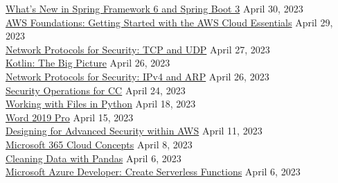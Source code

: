 \documentclass[10pt]{res} %
\begin{document}
\begin{resume}
\href{https://bjdelacruz.dev/files/certificates/pluralsight/Whats_New_in_Spring_Framework_6_and_Spring_Boot_3.pdf}{\color{blue}What's New in Spring Framework 6 and Spring Boot 3} \hfill April 30, 2023 \\
\href{https://bjdelacruz.dev/files/certificates/pluralsight/AWS_Foundations_Getting_Started_with_the_AWS_Cloud_Essentials.pdf}{\color{blue}AWS Foundations: Getting Started with the AWS Cloud Essentials} \hfill April 29, 2023 \\
\href{https://bjdelacruz.dev/files/certificates/pluralsight/4_Network_Protocols_for_Security_TCP_and_UDP.pdf}{\color{blue}Network Protocols for Security: TCP and UDP} \hfill April 27, 2023 \\
\href{https://bjdelacruz.dev/files/certificates/pluralsight/Kotlin_The_Big_Picture.pdf}{\color{blue}Kotlin: The Big Picture} \hfill April 26, 2023 \\
\href{https://bjdelacruz.dev/files/certificates/pluralsight/5_Network_Protocols_for_Security_IPv4_and_ARP.pdf}{\color{blue}Network Protocols for Security: IPv4 and ARP} \hfill April 26, 2023 \\
\href{https://bjdelacruz.dev/files/certificates/pluralsight/5_Security_Operations_for_CC.pdf}{\color{blue}Security Operations for CC\textservicemark} \hfill April 24, 2023 \\
\href{https://bjdelacruz.dev/files/certificates/pluralsight/Working_with_Files_in_Python.pdf}{\color{blue}Working with Files in Python} \hfill April 18, 2023 \\
\href{https://bjdelacruz.dev/files/certificates/pluralsight/Word_2019_Pro.pdf}{\color{blue}Word 2019 Pro} \hfill April 15, 2023 \\
\href{https://bjdelacruz.dev/files/certificates/pluralsight/Designing_for_Advanced_Security_within_AWS.pdf}{\color{blue}Designing for Advanced Security within AWS} \hfill April 11, 2023 \\
\href{https://bjdelacruz.dev/files/certificates/pluralsight/Microsoft_365_Cloud_Concepts.pdf}{\color{blue}Microsoft 365 Cloud Concepts} \hfill April 8, 2023 \\
\href{https://bjdelacruz.dev/files/certificates/pluralsight/Cleaning_Data_with_Pandas.pdf}{\color{blue}Cleaning Data with Pandas} \hfill April 6, 2023 \\
\href{https://bjdelacruz.dev/files/certificates/pluralsight/6_Microsoft_Azure_Developer_Create_Serverless_Functions.pdf}{\color{blue}Microsoft Azure Developer: Create Serverless Functions} \hfill April 6, 2023 \\

\end{resume}
\end{document}
